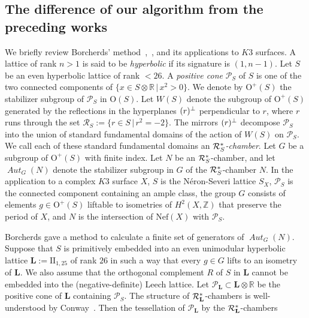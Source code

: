 \documentclass{amsart}
\theoremstyle{plain}
\theoremstyle{definition}
\theoremstyle{remark}
\numberwithin{equation}{section}
\numberwithin{table}{section}
\numberwithin{figure}{section}
\newcommand{\R}{\mathord{\mathbb R}}
\newcommand{\Z}{\mathord{\mathbb Z}}
\newcommand{\PPP}{\mathord{\mathcal P}}
\newcommand{\RRR}{\mathord{\mathcal R}}
\newcommand{\shortset}[2]{\{ {#1} \,|\, {#2}   \}}
\newcommand{\tensor}{\otimes}
\newcommand{\sperp}{\sp{\perp}}
\newcommand{\OG}{\mathord{\mathrm {O}}}
\renewcommand{\L}{\mathord{\mathbf{L}}}
\newcommand{\Nef}{\mathord{\mathrm{Nef}}}
\newcommand{\aut}{\operatorname{\mathit {Aut}}\nolimits}
\newcommand{\Roots}{\RRR}
\newcommand{\sphyp}{\sp*}
\newcommand{\Nc}{N}
\newcommand{\assumpone}{\mathord{\rm [SG1]}}
\newcommand{\assumptwo}{\mathord{\rm [SG2]}}
\newcommand{\assumpthree}{\mathord{\rm [SG3]}}
\begin{document}
\subsection{The difference of our algorithm from the preceding works}\label{subsec:history}
%
We briefly review 
 Borcherds' method~\cite{MR913200},~\cite{MR1654763},
and its applications to $K3$ surfaces.
A lattice of rank $n>1$ is said to be \emph{hyperbolic}  if 
its signature  is $(1, n-1)$.
Let $S$ be an even hyperbolic lattice of rank $<26$.
A \emph{positive cone} $\PPP_S$ of $S$ is one of  the two connected components
of $\shortset{x\in S\tensor \R}{x^2>0}$.
We denote by $\OG^+(S)$ the stabilizer subgroup of $\PPP_S$ in $\OG(S)$.
Let $W(S)$ denote the subgroup of $\OG^+(S)$ 
generated by the reflections in the hyperplanes $(r)\sperp$
perpendicular to $r$,
where $r$ runs through the set  $\Roots_S:=\shortset{r\in S}{r^2=-2}$.
The mirrors $(r)\sperp$
decompose $\PPP_{S}$ into the union of 
standard fundamental domains %
of the action of $W(S)$ on $\PPP_S$.
We call each of these standard fundamental domains
an \emph{$\Roots_{S}\sphyp$-chamber}.
Let $G$ be a subgroup of $\OG^+(S)$ with finite index.
Let $\Nc$ be an $\Roots_{S}\sphyp$-chamber,
and let $\aut_{G}(\Nc)$ denote the stabilizer subgroup in $G$
of the $\Roots_{S}\sphyp$-chamber $\Nc$.
In the application to a complex $K3$ surface $X$,
$S$ is the N\'eron-Severi lattice $S_X$,
$\PPP_S$ is the connected component containing an ample class,
the group $G$ consists of elements $g\in \OG^+(S)$
 liftable to  isometries of $H^2(X, \Z)$ that preserve the period of $X$,
and $\Nc$ is the intersection of  $\Nef(X)$ with $\PPP_S$.
%
\par
%
Borcherds gave a method to calculate 
a finite set of generators of $\aut_{G}(\Nc)$.
Suppose  that  $S$  is primitively embedded 
into an even unimodular hyperbolic lattice $\L:=\textrm{II}_{1, 25}$ of rank $26$
in such a way that every $g\in G$ lifts to an isometry of $\L$.
We also assume that the orthogonal complement $R$ of $S$ in $\L$
cannot be embedded into the (negative-definite) Leech lattice.
Let $\PPP_{\L}\subset \L\tensor\R$
be the  positive cone of $\L$ containing $\PPP_S$.
The structure of $\Roots_{\L}\sphyp$-chambers is well-understood by Conway~\cite[Chapter 27]{MR1662447}.
Then the tessellation of $\PPP_{\L}$  by the $\Roots_{\L}\sphyp$-chambers
\end{document}
